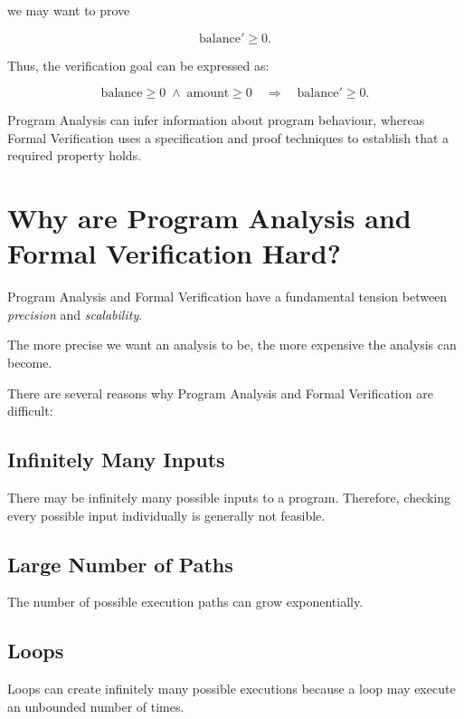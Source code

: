 we may want to prove

\[
\text{balance}' \geq 0.
\]

Thus, the verification goal can be expressed as:

\[
\text{balance} \geq 0
\;\land\;
\text{amount} \geq 0
\quad\Longrightarrow\quad
\text{balance}' \geq 0.
\]

\begin{ppnote}
Program Analysis can infer information about program behaviour,
whereas Formal Verification uses a specification and proof techniques
to establish that a required property holds.
\end{ppnote}


\section{Why are Program Analysis and Formal Verification Hard?}

Program Analysis and Formal Verification have a fundamental tension
between \emph{precision} and \emph{scalability}.

\begin{ppnote}
The more precise we want an analysis to be, the more expensive the
analysis can become.
\end{ppnote}

There are several reasons why Program Analysis and Formal Verification
are difficult:

\subsection{Infinitely Many Inputs}

There may be infinitely many possible inputs to a program. Therefore,
checking every possible input individually is generally not feasible.

\subsection{Large Number of Paths}

The number of possible execution paths can grow exponentially.

\subsection{Loops}

Loops can create infinitely many possible executions because a loop may
execute an unbounded number of times.


